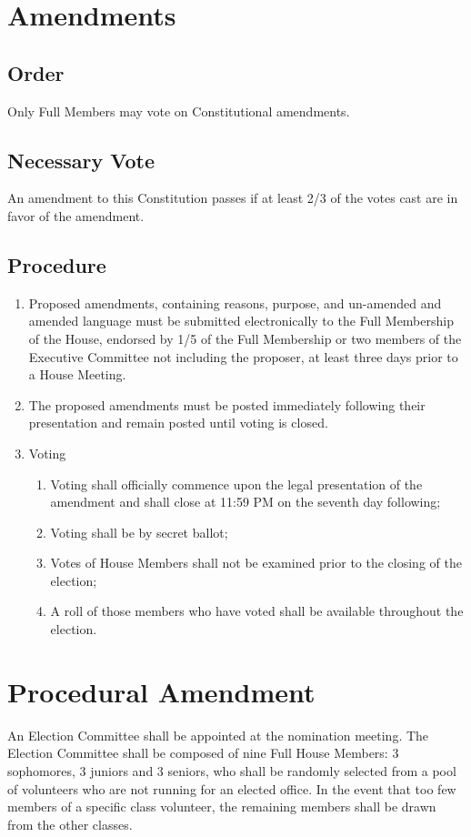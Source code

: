 \documentclass[10pt]{article} %
\begin{document}
\section{Amendments}
\subsection{Order}
Only Full Members may vote on Constitutional amendments.
\subsection{Necessary Vote}
An amendment to this Constitution passes if at least 2/3 of the votes cast are in favor of the amendment.
\subsection{Procedure}
\begin{enumerate}
\item Proposed amendments, containing reasons, purpose, and un-amended and amended language must be submitted electronically to the Full Membership of the House, endorsed by 1/5 of the Full Membership or two members of the Executive Committee not including the proposer, at least three days prior to a House Meeting.
\item The proposed amendments must be posted immediately following their presentation and remain posted until voting is closed.
\item Voting
\begin{enumerate}
\item Voting shall officially commence upon the legal presentation of the amendment and shall close at 11:59 PM on the seventh day following;
\item Voting shall be by secret ballot;
\item Votes of House Members shall not be examined prior to the closing of the election;
\item A roll of those members who have voted shall be available throughout the election.
\end{enumerate}
\end{enumerate}

\pagebreak
\appendix
\section{Procedural Amendment}
An Election Committee shall be appointed at the nomination meeting. The Election Committee shall be composed of nine Full House Members: 3 sophomores, 3 juniors and 3 seniors, who shall be randomly selected from a pool of volunteers who are not running for an elected office. In the event that too few members of a specific class volunteer, the remaining members shall be drawn from the other classes.
\end{document}
